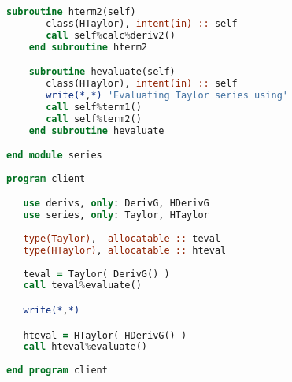 \documentclass[11pt,oneside]{article}
\begin{document}
\begin{appendices}
\begin{lstlisting}[language=Fortran]
    subroutine hterm2(self)
       class(HTaylor), intent(in) :: self
       call self%calc%deriv2()
    end subroutine hterm2

    subroutine hevaluate(self)
       class(HTaylor), intent(in) :: self
       write(*,*) 'Evaluating Taylor series using'
       call self%term1()
       call self%term2()
    end subroutine hevaluate

end module series
 
program client

   use derivs, only: DerivG, HDerivG
   use series, only: Taylor, HTaylor
   
   type(Taylor),  allocatable :: teval
   type(HTaylor), allocatable :: hteval
   
   teval = Taylor( DerivG() )
   call teval%evaluate()

   write(*,*)

   hteval = HTaylor( HDerivG() )
   call hteval%evaluate()
   
end program client
\end{lstlisting}

\end{appendices}
\end{document}
